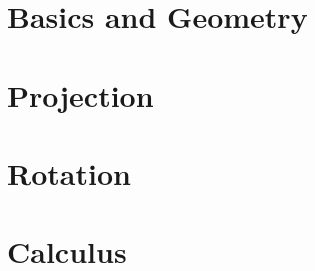 \part{Basics and Geometry}
   
   
   
   
   
   
   
   
   
   
   
   
   
   
   
   
   
   
   
   

\part{Projection}
   
   
   
   
   
   
   
   

\part{Rotation}
   
   
   
   
   
   
   
   

\part{Calculus}
   
   
   
   
   
   
   
   
   
   

